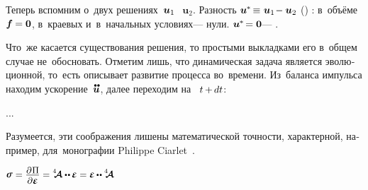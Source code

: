 \begin{otherlanguage}{russian}

Теперь вспомним о~двух решениях~${\bm{u}_1\hspace{-0.25ex}}$ ~${\bm{u}_2}$.
Разность ${\smash{\bm{u}^{\hspace{-0.1ex}*}} \hspace{-0.25ex} \equiv \hspace{.1ex} \bm{u}_1 \hspace{-0.36ex} - \bm{u}_2}$     ()  : в~объёме ${\bm{f} \hspace{-0.1ex} = \bm{0}}$, в~краевых и~в~начальных условиях\:--- нули.
 ${\smash{\bm{u}^{\hspace{-0.1ex}*}} \hspace{-0.32ex} = \bm{0}}$\:--- .

Что~же касается существования решения, то простыми выкладками его в~общем случае не~обосновать.
Отметим лишь, что динамическая задача является эволюционной, то~есть описывает развитие процесса во~времени.
Из~баланса импульса находим ускорение~$\mathdotdotabove{\bm{u}}$, далее переходим на~ ${t \hspace{-0.1ex} + \hspace{-0.15ex} dt}$:

...


Разумеется, эти соображения лишены математической точности, характерной, например, для~монографии Philippe Ciarlet~\cite{ciarlet-mathematicalelasticity}.

\end{otherlanguage}



\label{para:hookelaw}

\nopagebreak\vspace{-2.4em}
${\small \linearstress \hspace{.1ex} = \displaystyle \frac{\raisemath{-0.2em}{\partial\hspace{.1ex} \potential}}{\partial \infinitesimaldeformation} = \stiffnesstensor \dotdotp \hspace{-0.1ex} \infinitesimaldeformation = \infinitesimaldeformation \hspace{-0.1ex} \dotdotp \stiffnesstensor}$
\nopagebreak\vspace{.5em}

